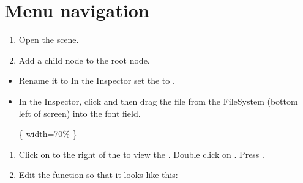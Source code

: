 \documentclass[letterpaper,10pt,english]{sphinxmanual}
\begin{document}
\section{Menu navigation}
\label{\detokenize{pandoc_tut:menu-navigation}}\begin{enumerate}
%
\item {} 
\sphinxAtStartPar
Open the  scene.

\item {} 
\sphinxAtStartPar
Add a  child node to the root node.

\end{enumerate}
\begin{itemize}
\item {} 
\sphinxAtStartPar
Rename it to 
In the Inspector set the  to .

\item {} 
\sphinxAtStartPar
In the Inspector, click  and then drag the  file from the
FileSystem (bottom left of screen) into the \sphinxstylestrong{{[}empty{]}}
font field.

\sphinxAtStartPar
{}\{ width=70\% \}

\end{itemize}
\begin{enumerate}
%
\item {} 
\sphinxAtStartPar
Click on  to the right of the  to view the .  Double click on .  Press .

\item {} 
\sphinxAtStartPar
Edit the function so that it looks like this:

\end{enumerate}
\end{document}
